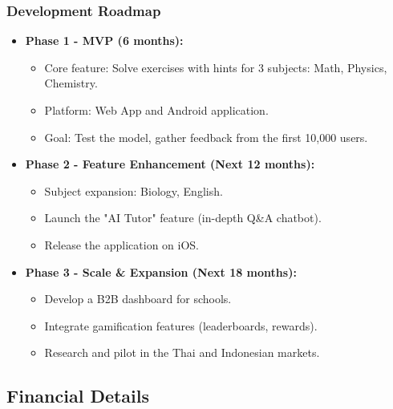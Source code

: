 \subsubsection{Development Roadmap}
\begin{itemize}
    \item \textbf{Phase 1 - MVP (6 months):}
    \begin{itemize}
        \item Core feature: Solve exercises with hints for 3 subjects: Math, Physics, Chemistry.
        \item Platform: Web App and Android application.
        \item Goal: Test the model, gather feedback from the first 10,000 users.
    \end{itemize}
    \item \textbf{Phase 2 - Feature Enhancement (Next 12 months):}
    \begin{itemize}
        \item Subject expansion: Biology, English.
        \item Launch the "AI Tutor" feature (in-depth Q\&A chatbot).
        \item Release the application on iOS.
    \end{itemize}
    \item \textbf{Phase 3 - Scale \& Expansion (Next 18 months):}
    \begin{itemize}
        \item Develop a B2B dashboard for schools.
        \item Integrate gamification features (leaderboards, rewards).
        \item Research and pilot in the Thai and Indonesian markets.
    \end{itemize}
\end{itemize}

\subsection{Financial Details}

